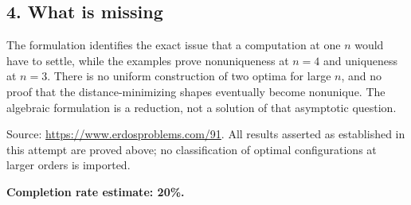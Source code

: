 \subsection*{4. What is missing}
The formulation identifies the exact issue that a computation at one $n$ would have to settle, while the examples prove nonuniqueness at $n=4$ and uniqueness at $n=3$. There is no uniform construction of two optima for large $n$, and no proof that the distance-minimizing shapes eventually become nonunique. The algebraic formulation is a reduction, not a solution of that asymptotic question.

Source: \url{https://www.erdosproblems.com/91}. All results asserted as established in this attempt are proved above; no classification of optimal configurations at larger orders is imported.

\textbf{Completion rate estimate: 20\%.}

